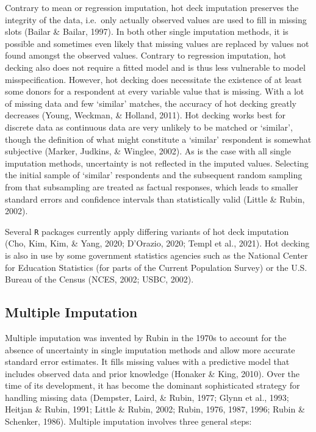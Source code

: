 \documentclass[12pt,econ]{sources/authesis}
\begin{document}
Contrary to mean or regression imputation, hot deck imputation preserves the integrity of the data, i.e.~only actually observed values are used to fill in missing slots (Bailar \& Bailar, 1997). In both other single imputation methods, it is possible and sometimes even likely that missing values are replaced by values not found amongst the observed values. Contrary to regression imputation, hot decking also does not require a fitted model and is thus less vulnerable to model misspecification. However, hot decking does necessitate the existence of at least some donors for a respondent at every variable value that is missing. With a lot of missing data and few `similar' matches, the accuracy of hot decking greatly decreases (Young, Weckman, \& Holland, 2011). Hot decking works best for discrete data as continuous data are very unlikely to be matched or `similar', though the definition of what might constitute a `similar' respondent is somewhat subjective (Marker, Judkins, \& Winglee, 2002). As is the case with all single imputation methods, uncertainty is not reflected in the imputed values. Selecting the initial sample of `similar' respondents and the subsequent random sampling from that subsampling are treated as factual responses, which leads to smaller standard errors and confidence intervals than statistically valid (Little \& Rubin, 2002).

Several \texttt{R} packages currently apply differing variants of hot deck imputation (Cho, Kim, Kim, \& Yang, 2020; D'Orazio, 2020; Templ et al., 2021). Hot decking is also in use by some government statistics agencies such as the National Center for Education Statistics (for parts of the Current Population Survey) or the U.S. Bureau of the Census (NCES, 2002; USBC, 2002).

\hypertarget{ordmiss-theory-multimpute}{%
\subsection{Multiple Imputation}\label{ordmiss-theory-multimpute}}

Multiple imputation was invented by Rubin in the 1970s to account for the absence of uncertainty in single imputation methods and allow more accurate standard error estimates. It fills missing values with a predictive model that includes observed data and prior knowledge (Honaker \& King, 2010). Over the time of its development, it has become the dominant sophisticated strategy for handling missing data (Dempster, Laird, \& Rubin, 1977; Glynn et al., 1993; Heitjan \& Rubin, 1991; Little \& Rubin, 2002; Rubin, 1976, 1987, 1996; Rubin \& Schenker, 1986). Multiple imputation involves three general steps:
\end{document}
